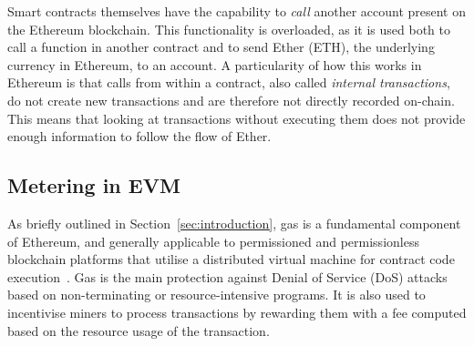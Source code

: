 Smart contracts themselves have the capability to \emph{call} another account present on the Ethereum blockchain. This functionality is overloaded, as it is used both to call a function in another contract and to send Ether (ETH), the underlying currency in Ethereum, to an account. A particularity of how this works in Ethereum is that calls from within a contract, also called \emph{internal transactions}, do not create new transactions and are therefore not directly recorded on-chain. This means that looking at transactions without executing them does not provide enough information to follow the flow of Ether.



\subsection{Metering in EVM}
As briefly outlined in Section~\ref{sec:introduction}, gas is a fundamental component of Ethereum, and generally applicable to permissioned and permissionless blockchain platforms that utilise a distributed virtual machine for contract code execution~\cite{tezos-about,eosio-about}. Gas is the main protection against Denial of Service (DoS) attacks based on non-terminating or resource-intensive programs. It is also used to incentivise miners to process transactions by rewarding them with a fee computed based on the resource usage of the transaction.

